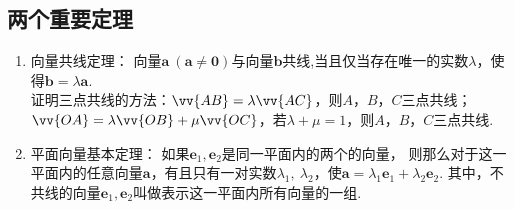   \subsection{两个重要定理}
    \begin{enumerate}[label=\arabic*)]
      \item 向量共线定理：
        向量$\bm{a}~(\bm{a}\ne\bm{0})$与向量$\bm{b}$共线,当且仅当存在唯一的实数$ \lambda $，使得$\bm{b}=\lambda\bm{a}$.\\
        {\kaishu
         证明三点共线的方法：$\vv{AB}=\lambda\vv{AC}$，则$A$，$B$，$C$三点共线；$\vv{OA}=\lambda\vv{OB}+\mu\vv{OC}$，若$\lambda+\mu=1$，则$A$，$B$，$C$三点共线.
        }
      \item 平面向量基本定理：
        如果$ \bm{e}_1,\bm{e}_2 $是同一平面内的两个的向量，
        则那么对于这一平面内的任意向量$ \bm{a} $，有且只有一对实数$ \lambda_1,~\lambda_2 $，使$\bm{a}=\lambda_1\bm{e}_1+\lambda_2\bm{e}_2$.
        其中，不共线的向量$\bm{e}_1, \bm{e}_2$叫做表示这一平面内所有向量的一组.\\
    \end{enumerate}
